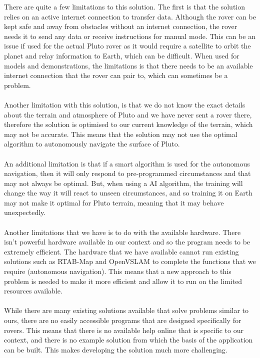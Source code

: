\documentclass[11pt]{report}
\begin{document}
There are quite a few limitations to this solution. The first is that the solution relies on an active internet connection to transfer data. Although the rover can be kept safe and away from obstacles without an internet connection, the rover needs it to send any data or receive instructions for manual mode. This can be an issue if used for the actual Pluto rover as it would require a satellite to orbit the planet and relay information to Earth, which can be difficult. When used for models and demonstrations, the limitations is that there needs to be an available internet connection that the rover can pair to, which can sometimes be a problem. 
\\\\
\noindent
Another limitation with this solution, is that we do not know the exact details about the terrain and atmosphere of Pluto and we have never sent a rover there, therefore the solution is optimised to our current knowledge of the terrain, which may not be accurate. This means that the solution may not use the optimal algorithm to autonomously navigate the surface of Pluto. 
\\\\
\noindent 
An additional limitation is that if a smart algorithm is used for the autonomous navigation, then it will only respond to pre-programmed circumstances and that may not always be optimal. But, when using a AI algorithm, the training will change the way it will react to unseen circumstances, and so training it on Earth may not make it optimal for Pluto terrain, meaning that it may behave unexpectedly.  
\\\\
\noindent
Another limitations that we have is to do with the available hardware. There isn't powerful hardware available in our context and so the program needs to be extremely efficient. The hardware that we have available cannot run existing solutions such as RTAB-Map and OpenVSLAM to complete the functions that we require (autonomous navigation). This means that a new approach to this problem is needed to make it more efficient and allow it to run on the limited resources available. 
\\\\
\noindent
While there are many existing solutions available that solve problems similar to ours, there are no easily accessible programs that are designed specifically for rovers. This means that there is no available help online that is specific to our context, and there is no example solution from which the basis of the application can be built. This makes developing the solution much more challenging. 
\end{document}
